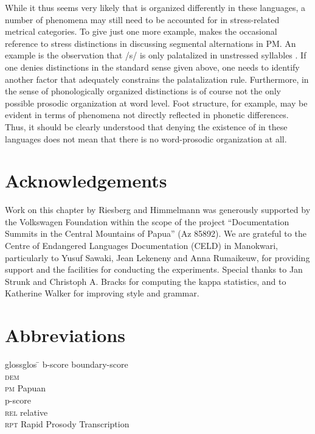 \documentclass[output=paper
,modfonts
,nonflat]{langsci/langscibook}
\begin{document}
While it thus seems very likely that  is organized differently in these languages, a number of phenomena may still need to be accounted for in stress-related metrical categories. To give just one more example, \citet{Kluge2014} makes the occasional reference to stress distinctions in discussing segmental alternations in PM. An example is the observation that /s/ is only palatalized in unstressed syllables \citep[73]{Kluge2014}. If one denies  distinctions in the standard sense given above, one needs to identify another factor that adequately constrains the palatalization rule. Furthermore,  in the sense of phonologically organized  distinctions is of course not the only possible prosodic organization at word level. Foot structure, for example, may be evident in terms of phenomena not directly reflected in phonetic differences. Thus, it should be clearly understood that denying the existence of  in these languages does not mean that there is no word-prosodic organization at all.

\section*{Acknowledgements}

Work on this chapter by Riesberg and Himmelmann was generously supported by the Volkswagen Foundation within the scope of the project “Documentation Summits in the Central Mountains of Papua” (Az 85892). We are grateful to the Centre of Endangered Languages Documentation (CELD) in Manokwari, particularly to Yusuf Sawaki, Jean Lekeneny and Anna Rumaikeuw, for providing support and the facilities for conducting the experiments. Special thanks to Jan Strunk and Christoph A. Bracks for computing the kappa statistics, and to Katherine Walker for improving style and grammar.

\section*{Abbreviations}

\begin{multicols}{2}
	\begin{tabbing}
		glossglos \= \kill
		b-score \> boundary-score\\
		\textsc{dem} \> \\
		\textsc{pm} \> Papuan \\
		p-score \> \\
		\textsc{rel} \> relative \\
		\textsc{rpt} \> Rapid Prosody Transcription
	\end{tabbing}
\end{multicols}
\end{document}
